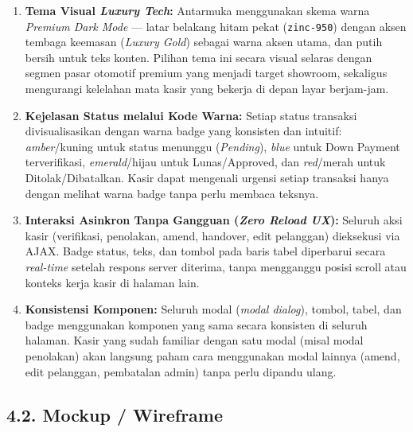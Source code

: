 \documentclass[11pt, a5paper]{article}
\begin{document}
\begin{enumerate}[label=\arabic*.]
  \item \textbf{Tema Visual \textit{Luxury Tech}:} Antarmuka menggunakan skema
        warna \textit{Premium Dark Mode} — latar belakang hitam pekat
        (\texttt{zinc-950}) dengan aksen tembaga keemasan (\textit{Luxury Gold})
        sebagai warna aksen utama, dan putih bersih untuk teks konten. Pilihan
        tema ini secara visual selaras dengan segmen pasar otomotif premium yang
        menjadi target showroom, sekaligus mengurangi kelelahan mata kasir yang
        bekerja di depan layar berjam-jam.

  \item \textbf{Kejelasan Status melalui Kode Warna:} Setiap status transaksi
        divisualisasikan dengan warna badge yang konsisten dan intuitif:
        \textit{amber}/kuning untuk status menunggu (\textit{Pending}),
        \textit{blue} untuk Down Payment terverifikasi, \textit{emerald}/hijau
        untuk Lunas/Approved, dan \textit{red}/merah untuk Ditolak/Dibatalkan.
        Kasir dapat mengenali urgensi setiap transaksi hanya dengan melihat warna
        badge tanpa perlu membaca teksnya.

  \item \textbf{Interaksi Asinkron Tanpa Gangguan (\textit{Zero Reload UX}):}
        Seluruh aksi kasir (verifikasi, penolakan, amend, handover, edit
        pelanggan) dieksekusi via AJAX. Badge status, teks, dan tombol pada
        baris tabel diperbarui secara \textit{real-time} setelah respons server
        diterima, tanpa mengganggu posisi scroll atau konteks kerja kasir di
        halaman lain.

  \item \textbf{Konsistensi Komponen:} Seluruh modal (\textit{modal dialog}),
        tombol, tabel, dan badge menggunakan komponen yang sama secara konsisten
        di seluruh halaman. Kasir yang sudah familiar dengan satu modal (misal
        modal penolakan) akan langsung paham cara menggunakan modal lainnya
        (amend, edit pelanggan, pembatalan admin) tanpa perlu dipandu ulang.
\end{enumerate}

\subsection*{4.2. Mockup / Wireframe}
\end{document}
